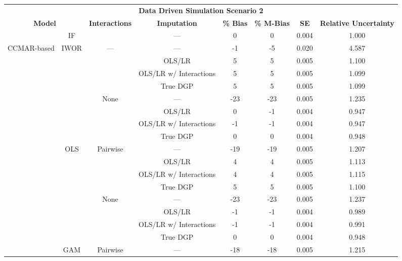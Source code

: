\begin{table}
\centering
\begin{tabular}[ht]{|>{}c|c|c|c|c|c|c|>{}c|}
\hline
\multicolumn{8}{|c|}{\textbf{Data Driven Simulation Scenario 2}} \\
\cline{1-8}
\multicolumn{2}{|c|}{\textbf{Model}} & \textbf{Interactions} & \textbf{Imputation} & \textbf{\% Bias} & \textbf{\% M-Bias} & \textbf{SE} & \textbf{Relative Uncertainty}\\
\hline
 & IF &  & --- & 0 & 0 & 0.004 & 1.000\\
\cline{2-2}
\cline{4-8}
\multirow{-2}{*}{\centering\arraybackslash CCMAR-based} & IWOR & \multirow{-2}{*}{\centering\arraybackslash ---} & --- & -1 & -5 & 0.020 & 4.587\\
\cline{1-8}
 &  &  & OLS/LR & 5 & 5 & 0.005 & 1.100\\
\cline{4-8}
 &  &  & OLS/LR w/ Interactions & 5 & 5 & 0.005 & 1.099\\
\cline{4-8}
 &  &  & True DGP & 5 & 5 & 0.005 & 1.099\\
\cline{4-8}
 &  & \multirow{-4}{*}{\centering\arraybackslash None} & --- & -23 & -23 & 0.005 & 1.235\\
\cline{3-8}
 &  &  & OLS/LR & 0 & -1 & 0.004 & 0.947\\
\cline{4-8}
 &  &  & OLS/LR w/ Interactions & -1 & -1 & 0.004 & 0.947\\
\cline{4-8}
 &  &  & True DGP & 0 & 0 & 0.004 & 0.948\\
\cline{4-8}
 & \multirow{-8}{*}{\centering\arraybackslash OLS} & \multirow{-4}{*}{\centering\arraybackslash Pairwise} & --- & -19 & -19 & 0.005 & 1.207\\
\cline{2-8}
 &  &  & OLS/LR & 4 & 4 & 0.005 & 1.113\\
\cline{4-8}
 &  &  & OLS/LR w/ Interactions & 4 & 4 & 0.005 & 1.115\\
\cline{4-8}
 &  &  & True DGP & 5 & 5 & 0.005 & 1.100\\
\cline{4-8}
 &  & \multirow{-4}{*}{\centering\arraybackslash None} & --- & -23 & -23 & 0.005 & 1.237\\
\cline{3-8}
 &  &  & OLS/LR & -1 & -1 & 0.004 & 0.989\\
\cline{4-8}
 &  &  & OLS/LR w/ Interactions & -1 & -1 & 0.004 & 0.991\\
\cline{4-8}
 &  &  & True DGP & 0 & 0 & 0.004 & 0.948\\
\cline{4-8}
 & \multirow{-8}{*}{\centering\arraybackslash GAM} & \multirow{-4}{*}{\centering\arraybackslash Pairwise} & --- & -18 & -18 & 0.005 & 1.215\\

\end{tabular}
\end{table}
